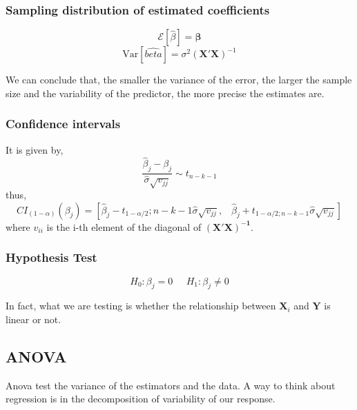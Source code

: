 \subsubsection{Sampling distribution of estimated coefficients}
\begin{equation}
    \mathcal{E}[\hat{\beta}] = \bm{\beta}
\end{equation}
\begin{equation}
    \text{Var}[\hat{beta}] = \sigma^2 (\bm{X'X})^{-1}
\end{equation}

We can conclude that, the smaller the variance of the error, the larger the
sample size and the variability of the predictor, the more precise the estimates
are.

\subsubsection{Confidence intervals}
It is given by,
\begin{equation}
    \frac{\hat{\beta}_{j}-\beta_{j}}{\hat{\sigma} \sqrt{v_{j j}}} \sim t_{n-k-1}
\end{equation}
thus,
\begin{equation}
    CI_{(1-\alpha)}\left(\beta_{j}\right)=\left[\hat{\beta}_{j}-t_{1-\alpha / 2} ; n-k-1 \hat{\sigma} \sqrt{v_{j j}},\;\;\;
     \hat{\beta}_{j}+t_{1-\alpha / 2 ; n-k-1} \hat{\sigma} \sqrt{v_{j j}}\right]
\end{equation}
where $v_{ii}$ is the i-th element of the diagonal of $\bm{(X'X)^{-1}}$.

\subsubsection{Hypothesis Test}
\begin{equation}
    H_0: \beta_j = 0 \;\;\;\;\; H_1: \beta_j \neq 0
\end{equation}

In fact, what we are testing is whether the relationship between $\bm{X}_i$ and
$\bm{Y}$ is linear or not.

\subsection{ANOVA}
Anova test the variance of the estimators and the data. A way to think about
regression is in the decomposition of variability of our response.


